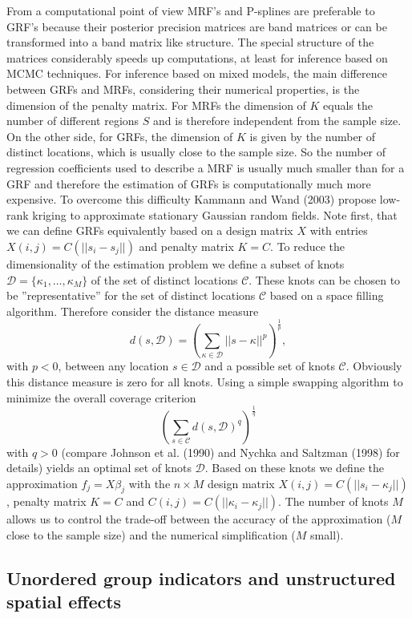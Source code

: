 \documentclass[11pt,a4paper,twoside]{bayesxarticle}
\begin{document}
From a computational point of view MRF's and P-splines are preferable to
GRF's because their posterior precision matrices are band matrices
or can be transformed into a band matrix like structure. The
special structure of the matrices considerably speeds up
computations, at least for inference based on MCMC techniques.
For inference based on mixed models, the main difference between GRFs and MRFs, considering their
numerical properties, is the dimension of the penalty matrix. For
MRFs the dimension of $K$ equals the number of different regions
$S$ and is therefore independent from the sample size. On the
other side, for GRFs, the dimension of $K$ is given by the number
of distinct locations, which is usually close to the sample size.
So the number of regression coefficients used to describe a MRF is
usually much smaller than for a GRF and therefore the estimation
of GRFs is computationally much more expensive. To overcome this
difficulty Kammann and Wand (2003) propose low-rank kriging to
approximate stationary Gaussian random fields. Note first, that we
can define GRFs equivalently based on a design matrix $X$ with
entries $X(i,j)=C(||s_i-s_j||)$ and penalty matrix $K=C$. To
reduce the dimensionality of the estimation problem we define a
subset of knots $\mathcal{D}=\{\kappa_1,\ldots,\kappa_M\}$ of the
set of distinct locations $\mathcal{C}$. These knots can be chosen
to be ''representative'' for the set of distinct locations
$\mathcal{C}$ based on a space filling algorithm. Therefore
consider the distance measure
\[d(s,\mathcal{D})=\left(\sum_{\kappa\in\mathcal{D}}||s-\kappa||^p\right)^{\frac{1}{p}},\]
with $p<0$, between any location $s\in\mathcal{D}$ and a possible
set of knots $\mathcal{C}$. Obviously this distance measure is
zero for all knots. Using a simple swapping algorithm to minimize
the overall coverage criterion
\[\left(\sum_{s\in\mathcal{C}}d(s,\mathcal{D})^q\right)^{\frac{1}{q}}\]
with $q>0$ (compare Johnson et al. (1990) and
Nychka and Saltzman (1998) for details) yields an optimal set of knots
$\mathcal{D}$. Based on these knots we define the approximation
$f_{j}=X\beta_j$ with the $n\times M$ design matrix
$X(i,j)=C(||s_i-\kappa_j||)$, penalty matrix $K=C$ and
$C(i,j)=C(||\kappa_i-\kappa_j||)$. The number of knots $M$ allows
us to control the trade-off between the accuracy of the
approximation ($M$ close to the sample size) and the numerical
simplification ($M$ small).

\subsection{Unordered group indicators and unstructured spatial effects}
\label{random}
\end{document}
